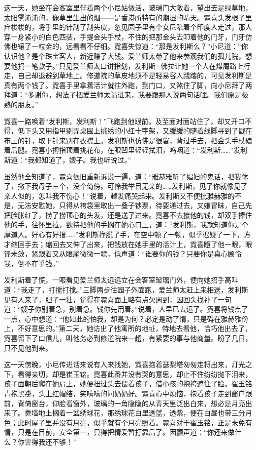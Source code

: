 \par 这一天，她坐在会客室里伴着两个小尼姑做活，玻璃门大敞着，望出去是绿草地，太阳雾沌沌的，像草里生出的烟——是香港所特有的潮湿的晴天。霓喜头发根子里痒梭梭的，将手里的针刮了刮头皮，忽见园子里有个女尼陪着个印度人走过，那人穿一身紧小的白色西装，手提金头手杖，不住的把那金头去叩着他的门牙，门牙仿佛也镶了一粒金的，远看看不仔细。霓喜失惊道：“那是发利斯么？”小尼道：“你认识他？是个珠宝客人，新近赚了大钱。爱兰师太带了他来参观我们的孤儿院，想要他捐一笔款子。”只见爱兰师太口讲指划，发利斯·佛拉让她一个人在煤屑路上行走，自己却退避到草地上。修道院的草皮地须不是轻易容人践踏的，可见发利斯是真有两个钱了。霓喜手里拿着活计就往外跑，到门口，又煞住了脚，向小尼拜了两拜道：“多谢你，想法子把爱兰师太请进来，我要跟那人说两句话哩。我们原是极熟的朋友。”
\par 霓喜一路唤着“发利斯，发利斯！”飞跑到他跟前。及至面对面站住了，却又开口不得，低下头又用指甲剔弄桌围上挑绣的小红十字架，又缓缓的随着线脚寻到了戳在布上的针，取下针来别在衣襟上。发利斯也仿佛是很窘，背过手去，把金头手杖磕着后腿。霓喜小拇指顶着挑花布，在眼凹里轻轻拭泪，呜咽道：“发利斯……”发利斯道：“我都知道了，嫂子。我也听说过。”
\par 虽然他全知道了，霓喜依旧重新诉说一遍，道：“雅赫雅听了娼妇的鬼话，把我休了，撇下我母子三个，没个倚傍。可怜我举目无亲的……发利斯，见了你就像见了亲人似的，怎叫我不伤心！”说着，越发痛哭起来。发利斯又不便批雅赫雅的不是，无法安慰她，只得从袴袋里取出一叠子钞票，待要递过去，又嫌冒昧，自己先把脸胀红了，捞了捞顶心的头发，还是送了过来。霓喜不去接他的钱，却双手捧住他的手，往怀里拉，欲待把他的手搁在她心口上，道：“发利斯，我就知道你是个厚道人。好心有好报……”发利斯挣脱了手，在空中顿了一顿，似乎迟疑了一下，方才缩回手去；缩回去又伸了出来，把钱放在她手里的活计上，霓喜瞪了他一眼，眼锋未敛，紧跟着又从眼尾微微一瞟，低声道：“谁要你的钱？只要你是真心顾怜我，倒不在乎钱。”
\par 发利斯着了慌，一眼看见爱兰师太远远立在会客室玻璃门外，便向她招手高叫道：“我走了，打搅打搅。”三脚两步往园子外面跑，爱兰师太赶上来相送，发利斯见有人来了，胆子一壮，觉得在霓喜面上略有点欠周到，因回头找补了一句道：“嫂子你别着急，别着急。钱你先用着。”说着，人早已去远了。霓喜将钱点了一点，心中想道：“他如此的怕我，却是为何？必定是动了情，只是碍在雅赫雅份上，不好意思的。”第二天，她访出了他寓所的地址，特地去看他，恰巧他出去了，霓喜留下了口信儿，叫他务必到修道院来一趟，有紧要的事与他商量。盼了几日，只不见他到来。
\par 这一天傍晚，小尼传进话来说有人来找她，霓喜抱着瑟梨塔匆匆走将出来，灯光之下，看得亲切，却是崔玉铭。霓喜此番并没有哭的意思，却止不住纷纷抛下泪来，孩子面朝后爬在她肩上，她便扭过头去偎着孩子，借小孩的袍袴遮住了脸。崔玉铭青袍黑褂，头上红帽结，笑嘻嘻的问奶奶好。霓喜心中烦恼，抱着孩子走到窗户跟前，背倚窗台，仰脸看窗外，玻璃的一角隐隐的从青天里泛出白来，想必是月亮出来了。靠墙地上搁着一盆绣球花，那绣球花白里透蓝，透紫，便在白昼也带三分月色；此时屋子里并没有月亮，似乎就有个月亮照着。霓喜对于崔玉铭，正是未免有情，只是在目前，安全第一，只得把情爱暂打靠后了。因颤声道：“你还来做什么？你害得我还不够！”
